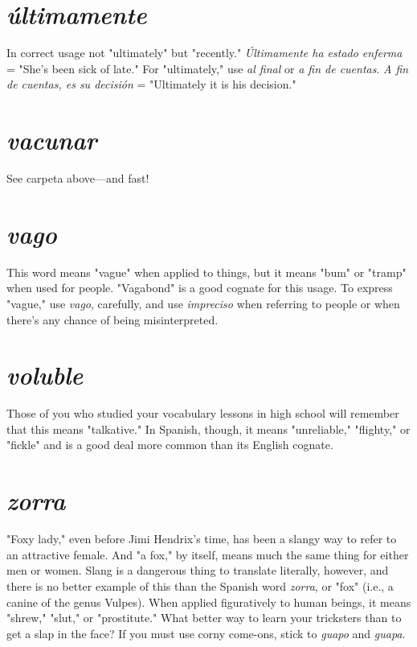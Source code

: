 \documentclass[14pt,a4paper,oneside]{memoir}
\begin{document}
\section{\emph{últimamente}}

In correct usage not "ultimately" but "recently." \emph{Últimamente ha estado enferma} = "She's been sick of late."
For "ultimately," use \emph{al final} or \emph{a fin de cuentas}. \emph{A fin de cuentas, es
su decisión} = "Ultimately it is his decision."

\section{\emph{vacunar}}

See carpeta above---and fast!

\section{\emph{vago}}

This word means "vague" when applied to things, but
it means "bum" or "tramp" when used for people. "Vagabond" is a
good cognate for this usage. To express "vague," use \emph{vago}, carefully,
and use \emph{impreciso} when referring to people or when there's any chance
of being misinterpreted.

\section{\emph{voluble}}

Those of you who studied your vocabulary lessons
in high school will remember that this means "talkative." In Spanish,
though, it means "unreliable," "flighty," or "fickle" and is a good deal
more common than its English cognate.

\section{\emph{zorra}}

"Foxy lady," even before Jimi Hendrix's time, has
been a slangy way to refer to an attractive female. And "a fox," by itself, means much the same thing for either men or women. Slang is a
dangerous thing to translate literally, however, and there is no better
example of this than the Spanish word \emph{zorra}, or "fox" (i.e., a canine
of the genus Vulpes). When applied figuratively to human beings, it
means "shrew," "slut," or "prostitute." What better way to learn your
tricksters than to get a slap in the face? If you must use corny come-ons, stick to \emph{guapo} and \emph{guapa}.
\end{document}
